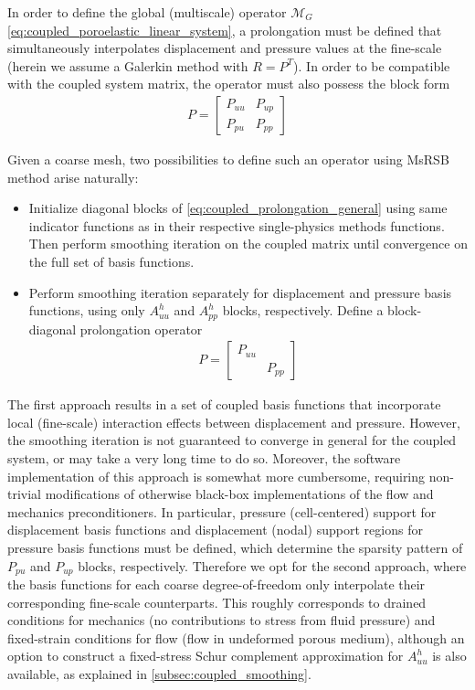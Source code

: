 In order to define the global (multiscale) operator $\mathcal{M}_G$ \cref{eq:coupled_poroelastic_linear_system}, a prolongation must be defined that simultaneously interpolates displacement and pressure values at the fine-scale (herein we assume a Galerkin method with $R = P^T$).   In order to be compatible with the coupled system matrix, the operator must also possess the block form
\begin{align}
    P = 
    \begin{bmatrix}
        P_{uu} & P_{up} \\
        P_{pu} & P_{pp}
    \end{bmatrix}
    \label{eq:coupled_prolongation_general}
\end{align}

Given a coarse mesh, two possibilities to define such an operator using MsRSB method arise naturally:
\begin{itemize}
    \item Initialize diagonal blocks of \cref{eq:coupled_prolongation_general} using same indicator functions as in their respective single-physics methods functions.   Then perform smoothing iteration  on the coupled matrix until convergence on the full set of basis functions.
    \item Perform smoothing iteration separately for displacement and pressure basis functions, using only $A_{uu}^h$ and $A_{pp}^h$ blocks, respectively.   Define a block-diagonal prolongation operator
    \begin{align}
        P = 
    \begin{bmatrix}
    P_{uu} &        \\
           & P_{pp}
    \end{bmatrix}
    \label{eq:coupled_prolongation}
    \end{align}
\end{itemize}

The first approach results in a set of coupled basis functions that incorporate local (fine-scale) interaction effects between displacement and pressure.   However, the smoothing iteration is not guaranteed to converge in general for the coupled system, or may take a very long time to do so.   Moreover, the software implementation of this approach is somewhat more cumbersome, requiring non-trivial modifications of otherwise black-box implementations of the flow and mechanics preconditioners.   In particular, pressure (cell-centered) support for displacement basis functions and displacement (nodal) support regions for pressure basis functions must be defined, which determine the sparsity pattern of $P_{pu}$ and $P_{up}$ blocks, respectively.   Therefore we opt for the second approach, where the basis functions for each coarse degree-of-freedom only interpolate their corresponding fine-scale counterparts.   This roughly corresponds to drained conditions for mechanics (no contributions to stress from fluid pressure) and fixed-strain conditions for flow (flow in undeformed porous medium), although an option to construct a fixed-stress Schur complement approximation for $A_{uu}^h$ is also available, as explained in \cref{subsec:coupled_smoothing}.

